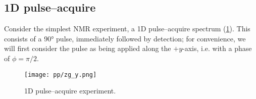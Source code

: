 \subsection{1D pulse--acquire}
\label{subsec:theory__pulseacq}

Consider the simplest NMR experiment, a 1D \proton{} pulse--acquire spectrum (\cref{fig:pulse_acquire}).
This consists of a \ang{90} pulse, immediately followed by detection; for convenience, we will first consider the pulse as being applied along the $+y$-axis, i.e. with a phase of $\phi = \pi/2$.

\begin{figure}[htbp]
    \centering
    \label{fig:pulse_acquire}
    \texttt{[image: pp/zg\_y.png]}
    \caption[Pulse--acquire experiment]{1D \proton{} pulse--acquire experiment.}
\end{figure}

